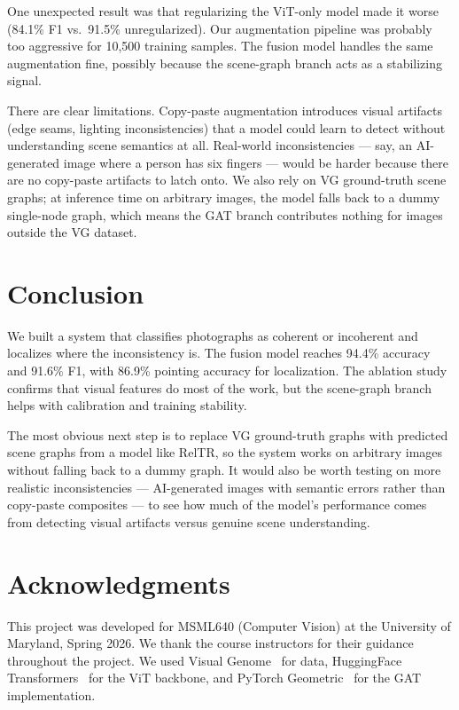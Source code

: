 \documentclass[conference]{IEEEtran}
\begin{document}
One unexpected result was that regularizing the ViT-only model made it worse (84.1\% F1 vs.\ 91.5\% unregularized). Our augmentation pipeline was probably too aggressive for 10,500 training samples. The fusion model handles the same augmentation fine, possibly because the scene-graph branch acts as a stabilizing signal.

There are clear limitations. Copy-paste augmentation introduces visual artifacts (edge seams, lighting inconsistencies) that a model could learn to detect without understanding scene semantics at all. Real-world inconsistencies --- say, an AI-generated image where a person has six fingers --- would be harder because there are no copy-paste artifacts to latch onto. We also rely on VG ground-truth scene graphs; at inference time on arbitrary images, the model falls back to a dummy single-node graph, which means the GAT branch contributes nothing for images outside the VG dataset.

\section{Conclusion}

We built a system that classifies photographs as coherent or incoherent and localizes where the inconsistency is. The fusion model reaches 94.4\% accuracy and 91.6\% F1, with 86.9\% pointing accuracy for localization. The ablation study confirms that visual features do most of the work, but the scene-graph branch helps with calibration and training stability.

The most obvious next step is to replace VG ground-truth graphs with predicted scene graphs from a model like RelTR, so the system works on arbitrary images without falling back to a dummy graph. It would also be worth testing on more realistic inconsistencies --- AI-generated images with semantic errors rather than copy-paste composites --- to see how much of the model's performance comes from detecting visual artifacts versus genuine scene understanding.

\section*{Acknowledgments}

This project was developed for MSML640 (Computer Vision) at the University of Maryland, Spring 2026. We thank the course instructors for their guidance throughout the project. We used Visual Genome~\cite{krishna2017visual} for data, HuggingFace Transformers~\cite{wolf2020transformers} for the ViT backbone, and PyTorch Geometric~\cite{fey2019fast} for the GAT implementation.
\end{document}
